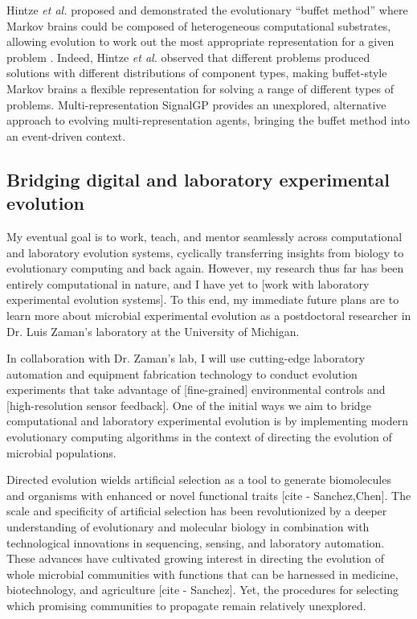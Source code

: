 Hintze \textit{et al.} proposed and demonstrated the evolutionary ``buffet method'' where Markov brains could be composed of heterogeneous computational substrates, allowing evolution to work out the most appropriate representation for a given problem \citep{hintze_buffet_2019}. 
Indeed, Hintze \textit{et al.} observed that different problems produced solutions with different distributions of component types, making buffet-style Markov brains a flexible representation for solving a range of different types of problems. 
Multi-representation SignalGP provides an unexplored, alternative approach to evolving multi-representation agents, bringing the buffet method into an event-driven context.

\subsection{Bridging digital and laboratory experimental evolution}


My eventual goal is to work, teach, and mentor seamlessly across computational and laboratory evolution systems, cyclically transferring insights from biology to evolutionary computing and back again.
However, my research thus far has been entirely computational in nature, and I have yet to [work with laboratory experimental evolution systems].
To this end, my immediate future plans are to learn more about microbial experimental evolution as a postdoctoral researcher in Dr. Luis Zaman's laboratory at the University of Michigan.

In collaboration with Dr. Zaman's lab, I will use cutting-edge laboratory automation and equipment fabrication technology to conduct evolution experiments that take advantage of [fine-grained] environmental controls and [high-resolution sensor feedback].
One of the initial ways we aim to bridge computational and laboratory experimental evolution is by implementing modern evolutionary computing algorithms in the context of directing the evolution of microbial populations. 

Directed evolution wields artificial selection as a tool to generate biomolecules and organisms with enhanced or novel functional traits [cite - Sanchez,Chen].
The scale and specificity of artificial selection has been revolutionized by a deeper understanding of evolutionary and molecular biology in combination with technological innovations in sequencing, sensing, and laboratory automation.
These advances have cultivated growing interest in directing the evolution of whole microbial communities with functions that can be harnessed in medicine, biotechnology, and agriculture [cite - Sanchez]. 
Yet, the procedures for selecting which promising communities to propagate remain relatively unexplored.

